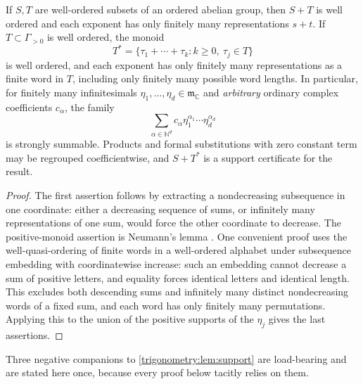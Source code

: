 \documentclass[11pt,letterpaper]{article}
\numberwithin{equation}{section}
\theoremstyle{definition}
\theoremstyle{remark}
\newcommand{\C}{\mathbb C}
\newcommand{\N}{\mathbb N}
\newcommand{\mm}{\mathfrak m}
\begin{document}
\begin{lemma}\label{trigonometry:lem:support}
If $S,T$ are well-ordered subsets of an ordered abelian group, then $S+T$ is well ordered and each
exponent has only finitely many representations $s+t$. If $T\subset\Gamma_{>0}$ is well ordered,
the monoid
\[
 T^*=\{\tau_1+\cdots+\tau_k:k\ge0,\ \tau_j\in T\}
\]
is well ordered, and each exponent has only finitely many representations as a finite word in $T$,
including only finitely many possible word lengths. In particular, for finitely many infinitesimals
$\eta_1,\dots,\eta_d\in\mm_{\C}$ and \emph{arbitrary} ordinary complex coefficients $c_\alpha$, the
family
\[
 \sum_{\alpha\in\N^d}c_\alpha\eta_1^{\alpha_1}\cdots\eta_d^{\alpha_d}
\]
is strongly summable. Products and formal substitutions with zero constant term may be regrouped
coefficientwise, and $S+T^*$ is a support certificate for the result.
\end{lemma}
\begin{proof}
The first assertion follows by extracting a nondecreasing subsequence in one coordinate: either a
decreasing sequence of sums, or infinitely many representations of one sum, would force the other
coordinate to decrease. The positive-monoid assertion is Neumann's lemma \cite{Neumann}. One
convenient proof uses the well-quasi-ordering of finite words in a well-ordered alphabet under
subsequence embedding with coordinatewise increase: such an embedding cannot decrease a sum of
positive letters, and equality forces identical letters and identical length. This excludes both
descending sums and infinitely many distinct nondecreasing words of a fixed sum, and each word has
only finitely many permutations. Applying this to the union of the positive supports of the
$\eta_j$ gives the last assertions.
\end{proof}

Three negative companions to \cref{trigonometry:lem:support} are load-bearing and are stated here
once, because every proof below tacitly relies on them.
\end{document}
